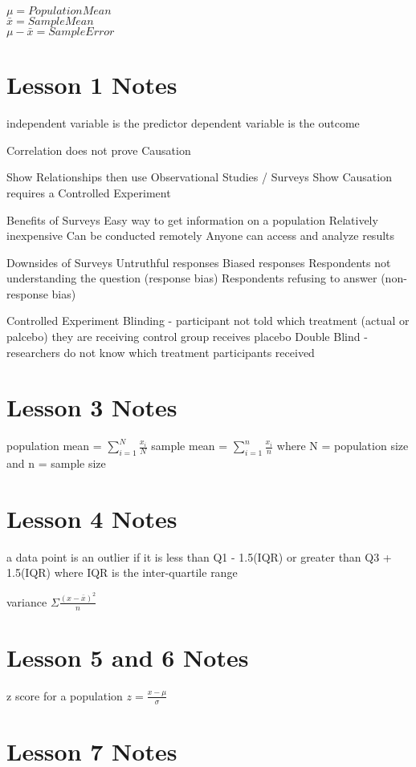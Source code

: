 \documentclass{article}
\begin{document}
\(\mu=Population Mean\)\\
\(\bar{x}=Sample Mean\)\\
\(\mu - \bar{x}=Sample Error\)

\section{Lesson 1 Notes}
  independent variable is the predictor
  dependent variable is the outcome 

  Correlation does not prove Causation

  Show Relationships then use Observational Studies / Surveys
  Show Causation requires a Controlled Experiment

  Benefits of Surveys
  Easy way to get information on a population
  Relatively inexpensive
  Can be conducted remotely
  Anyone can access and analyze results

  Downsides of Surveys
  Untruthful responses
  Biased responses
  Respondents not understanding the question (response bias)
  Respondents refusing to answer (non-response bias)


  Controlled Experiment
  Blinding - participant not told which treatment (actual or palcebo) they are receiving
  control group receives placebo
  Double Blind - researchers do not know which treatment participants received
  
\section{Lesson 3 Notes}

population mean = \(\sum_{i=1}^{N} \frac{x_i}{N}\)
sample mean = \(\sum_{i=1}^{n} \frac{x_i}{n}\)
where N = population size
and n = sample size

\section{Lesson 4 Notes}
a data point is an outlier if it is less than Q1 - 1.5(IQR)
or greater than Q3 + 1.5(IQR)
where IQR is the inter-quartile range

variance
\(\Sigma \frac{(x - \bar{x})^2}{n}\)

\section{Lesson 5 and 6 Notes}
z score for a population
\( z = \frac{x - \mu}{\sigma}\) 

\section{Lesson 7 Notes}
\end{document}
